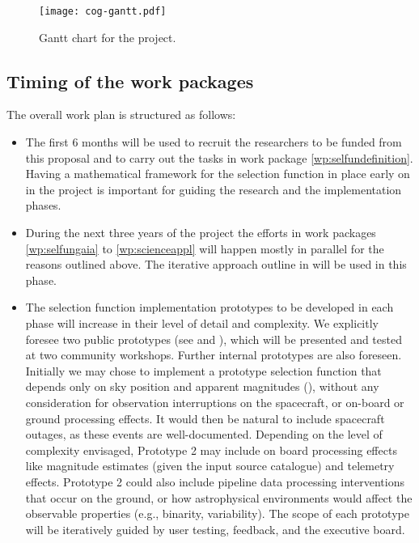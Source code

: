 \begin{figure}[ht!]
    \centering
    \texttt{[image: cog-gantt.pdf]}
    \caption{Gantt chart for the {\acro} project.}
    \label{fig:gantt}
\end{figure}

\subsection{Timing of the work packages}
\label{sec:wptiming}

The overall work plan is structured as follows:
\begin{itemize}
    \item The first 6 months will be used to recruit the researchers to be funded from this proposal and to carry out the tasks in work package \ref{wp:selfundefinition}. Having a mathematical framework for the selection function in place early on in the project is important for guiding the research and the implementation phases.
    \item During the next three years of the project the efforts in work packages \ref{wp:selfungaia} to \ref{wp:scienceappl} will happen mostly in parallel for the reasons outlined above. The iterative approach outline in  will be used in this phase.
   \item The selection function implementation prototypes to be developed in each phase will increase in their level of detail and complexity. We explicitly foresee two public prototypes (see  and ), which will be presented and tested at two community workshops. Further internal prototypes are also foreseen. Initially we may chose to implement a prototype selection function that depends only on sky position and apparent magnitudes (), without any consideration for observation interruptions on the spacecraft, or on-board or ground processing effects. It would then be natural to include spacecraft outages, as these events are well-documented. Depending on the level of complexity envisaged, Prototype 2 may include on board processing effects like magnitude estimates (given the input source catalogue) and telemetry effects. Prototype 2 could also include pipeline data processing interventions that occur on the ground, or how astrophysical environments would affect the observable properties (e.g., binarity, variability). The scope of each prototype will be iteratively guided by user testing, feedback, and the executive board.
 \end{itemize}

